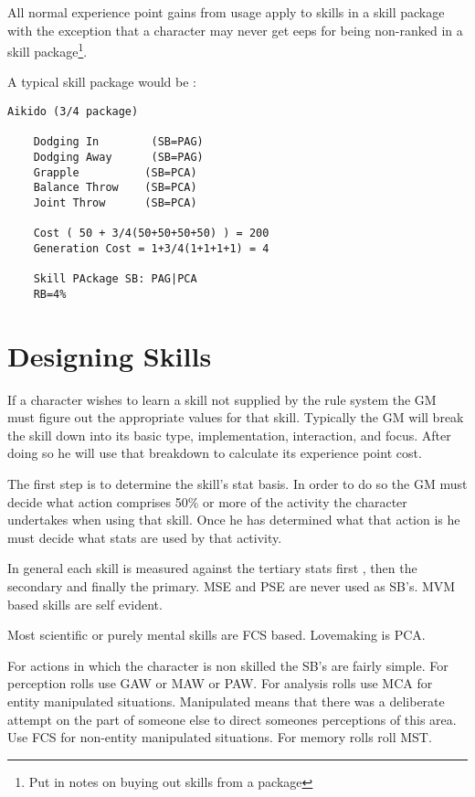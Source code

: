 All normal experience point gains from usage apply to skills in a skill
package with the exception that a character may never get eeps for
being non-ranked in a skill package\footnote{Put in notes on buying
out skills from a package}.

A typical skill package would be :

\begin{verbatim}
Aikido (3/4 package)

	Dodging In		  (SB=PAG)
	Dodging Away	  (SB=PAG)
	Grapple			 (SB=PCA)
	Balance Throw	 (SB=PCA)
	Joint Throw		 (SB=PCA)

	Cost ( 50 + 3/4(50+50+50+50) ) = 200
	Generation Cost = 1+3/4(1+1+1+1) = 4

	Skill PAckage SB: PAG|PCA
	RB=4%

\end{verbatim}

\section{Designing Skills}

If a character wishes to learn a skill not supplied by the rule
system the GM must figure out the appropriate values for that skill.
Typically the GM will break the skill down into its basic type,
implementation, interaction, and focus. After doing so he will use
that breakdown to calculate its experience point cost.

The first step is to determine the skill's stat basis. In order to do
so the GM must decide what action comprises 50\% or more of the activity
the character undertakes when using that skill. Once he has determined
what that action is he must decide what stats are used by that activity.

In general each skill is measured against the tertiary stats first , then the
secondary and finally the primary. MSE and PSE are never used as SB's.
MVM based skills are self evident.

Most scientific or purely mental skills are FCS based.
Lovemaking is PCA.

For actions in which the character is non skilled the SB's are fairly
simple. For perception rolls use GAW or MAW or PAW. For analysis rolls
use MCA for entity manipulated situations. Manipulated means that there
was a deliberate attempt on the part of someone else to direct someones
perceptions of this area. Use FCS for non-entity manipulated
situations. For memory rolls roll MST.

